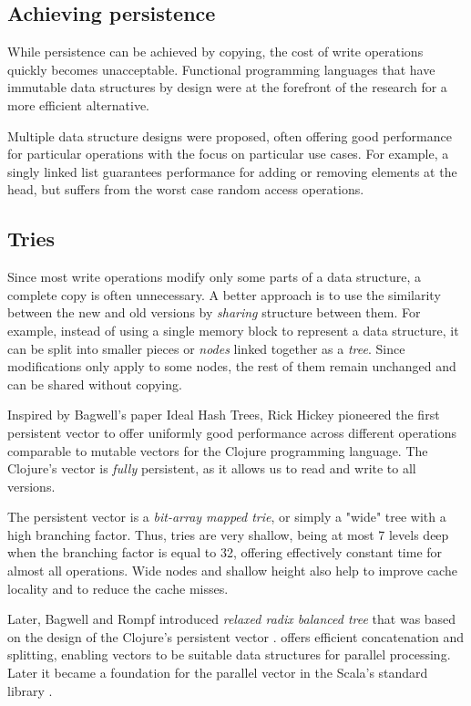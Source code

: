 \subsection{Achieving persistence}
While persistence can be achieved by copying, the cost of write operations quickly becomes unacceptable. Functional programming languages that have immutable data structures by design were at the forefront of the research for a more efficient alternative.

Multiple data structure designs were proposed, often offering good performance for particular operations with the focus on particular use cases. For example, a singly linked list guarantees  performance for adding or removing elements at the head, but suffers from the worst case  random access operations.

\subsection{Tries}
Since most write operations modify only some parts of a data structure, a complete copy is often unnecessary. A better approach is to use the similarity between the new and old versions by \emph{sharing} structure between them. For example, instead of using a single memory block to represent a data structure, it can be split into smaller pieces or \emph{nodes} linked together as a \emph{tree}. Since modifications only apply to some nodes, the rest of them remain unchanged and can be shared without copying.

Inspired by Bagwell's paper Ideal Hash Trees\cite{ideal-hash-trees}, Rick Hickey pioneered the first persistent vector to offer uniformly good performance across different operations comparable to mutable vectors for the Clojure programming language. The Clojure's vector is \emph{fully} persistent, as it allows us to read and write to all versions.

The persistent vector is a \emph{bit-array mapped trie}, or simply a "wide" tree with a high branching factor. Thus, tries are very shallow, being at most 7 levels deep when the branching factor is equal to 32, offering effectively constant time for almost all operations. Wide nodes and shallow height also help to improve cache locality and to reduce the cache misses.

Later, Bagwell and Rompf introduced \emph{relaxed radix balanced tree} that was based on the design of the Clojure's persistent vector \cite{efficient-immutable-vectors}. \treerrb{} offers efficient concatenation and splitting, enabling vectors to be suitable data structures for parallel processing. Later it became a foundation for the parallel vector in the Scala's standard library \cite{rrb-vector-practical-general-purpose-im-sequence}.

